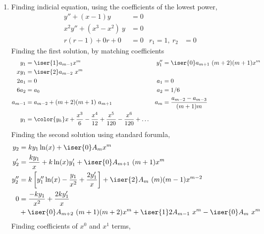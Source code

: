 \begin{enumerate}
    \item Finding indicial equation, using the coefficients of the lowest power,
          \begin{align}
              y'' + (x-1)y             & = 0   \\
              x^2 y'' + (x^3 - x^2)\ y & = 0   \\
              r(r - 1) + 0r + 0        & = 0 &
              r_1 = 1,\ r_2            & = 0
          \end{align}
          Finding the first solution, by matching coefficients
          \begin{align}
              y_1     & = \iser{1} a_{m-1} x^{m}            &
              y_1''   & = \iser{0} a_{m+1}\ (m+2)(m+1)x^{m}   \\
              x y_1   & = \iser{2} a_{m-2}\ x^{m}             \\
              2a_1    & = 0                                 &
              a_1     & = 0                                   \\
              6a_2    & = a_0                               &
              a_2     & = 1/6                                 \\
              a_{m-1} & = a_{m-2} + (m+2)(m+1)\ a_{m+1}     &
              a_{m}   & = \frac{a_{m-2} - a_{m-3}}{(m+1)m}    \\
              y_1     & = {\color{y_h} x + \frac{x^3}{6}
              - \frac{x^4}{12} + \frac{x^5}{120} - \frac{x^6}{120} + \dots}
          \end{align}
          Finding the second solution using standard forumla,
          \begin{align}
              y_2   & = ky_1\ln(x) + \iser{0}A_m x^m                             \\
              y_2'  & = \frac{ky_1}{x} + k\ln(x)y_1' + \iser{0}A_{m+1}\ (m+1)x^m \\
              y_2'' & = k\left[y_1'' \ln(x) - \frac{y_1}{x^2}
              + \frac{2y_1'}{x}\right] + \iser{2}A_m\ (m)(m-1)x^{m-2}            \\
              0     & = \frac{-ky_1}{x^2} + \frac{2ky_1'}{x}                     \\
                    & + \iser{0}A_{m+2}\ (m+1)(m+2) x^m
              + \iser{1}2 A_{m-1}\ x^{m} - \iser{0} A_m\ x^m
          \end{align}
          Finding coefficients of $ x^0 $ and $ x^1 $ terms,
          \begin{align}

\end{align}
\end{enumerate}
